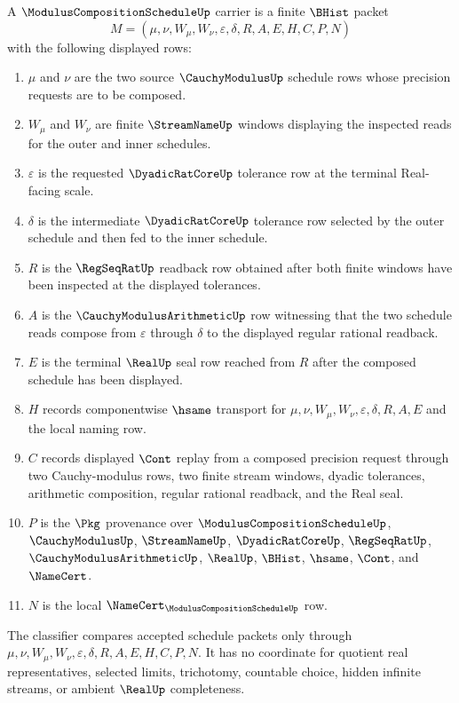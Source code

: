 \begin{definition}
\label{def:modulus-composition-schedule-carrier}
A $\ModulusCompositionScheduleUp$ carrier is a finite $\BHist$ packet
$$
M=(\mu,\nu,W_{\mu},W_{\nu},\varepsilon,\delta,R,A,E,H,C,P,N)
$$
with the following displayed rows:
\begin{enumerate}
\item $\mu$ and $\nu$ are the two source $\CauchyModulusUp$ schedule rows whose precision requests are to be composed.
\item $W_{\mu}$ and $W_{\nu}$ are finite $\StreamNameUp$ windows displaying the inspected reads for the outer and inner schedules.
\item $\varepsilon$ is the requested $\DyadicRatCoreUp$ tolerance row at the terminal Real-facing scale.
\item $\delta$ is the intermediate $\DyadicRatCoreUp$ tolerance row selected by the outer schedule and then fed to the inner schedule.
\item $R$ is the $\RegSeqRatUp$ readback row obtained after both finite windows have been inspected at the displayed tolerances.
\item $A$ is the $\CauchyModulusArithmeticUp$ row witnessing that the two schedule reads compose from $\varepsilon$ through $\delta$ to the displayed regular rational readback.
\item $E$ is the terminal $\RealUp$ seal row reached from $R$ after the composed schedule has been displayed.
\item $H$ records componentwise $\hsame$ transport for $\mu,\nu,W_{\mu},W_{\nu},\varepsilon,\delta,R,A,E$ and the local naming row.
\item $C$ records displayed $\Cont$ replay from a composed precision request through two Cauchy-modulus rows, two finite stream windows, dyadic tolerances, arithmetic composition, regular rational readback, and the Real seal.
\item $P$ is the $\Pkg$ provenance over $\ModulusCompositionScheduleUp$, $\CauchyModulusUp$, $\StreamNameUp$, $\DyadicRatCoreUp$, $\RegSeqRatUp$, $\CauchyModulusArithmeticUp$, $\RealUp$, $\BHist$, $\hsame$, $\Cont$, and $\NameCert$.
\item $N$ is the local $\NameCert_{\ModulusCompositionScheduleUp}$ row.
\end{enumerate}
The classifier compares accepted schedule packets only through $\mu,\nu,W_{\mu},W_{\nu},\varepsilon,\delta,R,A,E,H,C,P,N$. It has no coordinate for quotient real representatives, selected limits, trichotomy, countable choice, hidden infinite streams, or ambient $\RealUp$ completeness.
\end{definition}

